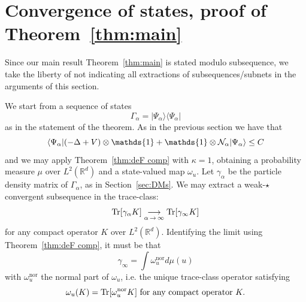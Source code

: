 \documentclass[AHL,Unicode,longabstracts,published]{cedram}
\DeclareMathOperator{\Tr}{Tr}
\DeclareMathOperator{\nor}{nor}
\newcommand{\R}{\mathbb{R}}
\newcommand{\cN}{\mathcal{N}}
\newcommand{\1}{\mathds{1}}
\renewcommand*{\to}{\mathchoice{\longrightarrow}{\rightarrow}{\rightarrow}{\rightarrow}}
\let\originalleft\left
\let\originalright\right
\renewcommand{\left}{\mathopen{}\mathclose\bgroup\originalleft}
\renewcommand{\right}{\aftergroup\egroup\originalright}
\begin{document}
\section{Convergence of states, proof of Theorem~\ref{thm:main}}\label{sec:limit}

Since our main result Theorem~\ref{thm:main} is stated modulo subsequence, we take the liberty of not indicating all extractions of subsequences/subnets in the arguments of this section.

We start from a sequence of states
\begin{equation*}
\Gamma_\alpha = |\Psi_\alpha\rangle \langle \Psi_\alpha |
\end{equation*}
as in the statement of the theorem. As in the previous section we have that
\begin{equation}\label{eq:apriori bis}
\left\langle\Psi_\alpha| \left(- \Delta + V \right) \otimes \1 + \1 \otimes \cN_\alpha | \Psi_\alpha \right\rangle \leq C
\end{equation}
and we may apply Theorem~\ref{thm:deF comp} with $\kappa = 1$, obtaining a probability measure $\mu$ over $L^2 (\R^d)$ and a state-valued map $\omega_u$. Let $\gamma_\alpha$ be the particle density matrix of $\Gamma_\alpha$, as in Section~\ref{sec:DMs}. We may extract a weak-$\star$ convergent subsequence in the trace-class:
\begin{equation}\label{eq:weak star}
\Tr \left[\gamma_\alpha K \right] \underset{\alpha\,\to\,\infty}{\to} \Tr \left[\gamma_\infty K \right]
\end{equation}
for any compact operator $K$ over $L^2(\R^d)$. Identifying the limit using Theorem~\ref{thm:deF comp}, it must be that
\begin{equation}\label{eq:gamma inf}
\gamma_\infty = \int \omega_u ^{\nor} d\mu (u)
\end{equation}
with $\omega_u ^{\nor}$ the normal part of $\omega_u$, i.e. the unique trace-class operator satisfying
\begin{equation}\label{eq:normal part}
\omega_u (K) = \Tr \left[\omega_u ^{\nor} K \right] \text{ for any compact operator } K.
\end{equation}
\end{document}
